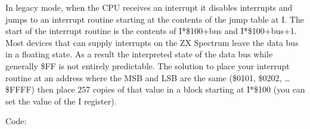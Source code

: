 In legacy mode, when the CPU receives an interrupt it disables
interrupts and jumps to an interrupt routine starting at the contents
of the jump table at I. The start of the interrupt routine is the
contents of I*\$100+bus and I*\$100+bus+1. Most devices that can
supply interrupts on the ZX Spectrum leave the data bus in a floating
state.  As a result the interpreted state of the data bus while
generally \$FF is not entirely predictable.  The solution to place
your interrupt routine at an address where the MSB and LSB are the
same (\$0101, \$0202, … \$FFFF) then place 257 copies of that value in
a block starting at I*\$100 (you can set the value of the I register).

Code:




